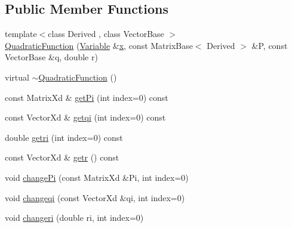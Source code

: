 \subsection*{Public Member Functions}
\begin{DoxyCompactItemize}
\item 
{\footnotesize template$<$class Derived , class Vector\+Base $>$ }\\\hyperlink{classocra_1_1QuadraticFunction_a9955f993dd22831561b3b67767f72a0d}{Quadratic\+Function} (\hyperlink{classocra_1_1Variable}{Variable} \&\hyperlink{classocra_1_1Function_a28825886d1f149c87b112ec2ec1dd486}{x}, const Matrix\+Base$<$ Derived $>$ \&P, const Vector\+Base \&q, double r)
\item 
virtual \hyperlink{classocra_1_1QuadraticFunction_a84bd0afec5679c1620170a97fd1be648}{$\sim$\+Quadratic\+Function} ()
\item 
const Matrix\+Xd \& \hyperlink{classocra_1_1QuadraticFunction_a175c8f8a5165ecfc595b468a4cd348a5}{get\+Pi} (int index=0) const 
\item 
const Vector\+Xd \& \hyperlink{classocra_1_1QuadraticFunction_a3795b64e2d6d5ed9ca1ebe7df76c7245}{getqi} (int index=0) const 
\item 
double \hyperlink{classocra_1_1QuadraticFunction_ab12a5e43ae6b38dae5681fdef2657069}{getri} (int index=0) const 
\item 
const Vector\+Xd \& \hyperlink{classocra_1_1QuadraticFunction_a1d4cd9210f612589aa49bb0c04be2544}{getr} () const 
\item 
void \hyperlink{classocra_1_1QuadraticFunction_ab2a6c4e433226c423f7a3dff95f68998}{change\+Pi} (const Matrix\+Xd \&Pi, int index=0)
\item 
void \hyperlink{classocra_1_1QuadraticFunction_a338c4fb88dd0a11cf63ff76ed572c895}{changeqi} (const Vector\+Xd \&qi, int index=0)
\item 
void \hyperlink{classocra_1_1QuadraticFunction_a5322e69813282ff9af8a13d00f4cebfc}{changeri} (double ri, int index=0)
\end{DoxyCompactItemize}
